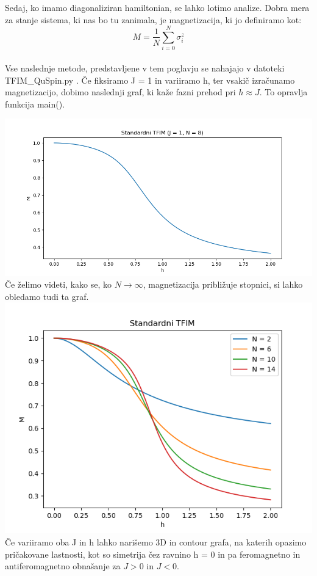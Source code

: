 \documentclass{article}
\begin{document}
 

\noindent Sedaj, ko imamo diagonaliziran hamiltonian, se lahko lotimo analize. Dobra mera za stanje sistema, ki nas bo tu zanimala, je magnetizacija, ki jo definiramo kot:
\begin{equation}
    M = \frac{1}{N}\sum_{i=0}^N \sigma_i^z
\end{equation}\\
Vse naslednje metode, predstavljene v tem poglavju se nahajajo v datoteki TFIM\_QuSpin.py .
Če fiksiramo J = 1 in variiramo h, ter vsakič izračunamo magnetizacijo, dobimo naslednji graf, ki kaže fazni prehod pri $h \approx J$. To opravlja funkcija main().

\includegraphics[width = \linewidth]{STFIM1.png}
Če želimo videti, kako se, ko $N \rightarrow \infty$, magnetizacija približuje stopnici, si lahko obledamo tudi ta graf.
\includegraphics[width = \linewidth]{STFIM_variableN2.png}
\newpage
\noindent Če variiramo oba J in h lahko narišemo 3D in contour grafa, na katerih opazimo pričakovane lastnosti, kot so simetrija čez ravnino h = 0 in pa feromagnetno in antiferomagnetno obnašanje za $J > 0$ in $J < 0$.\\\\
\end{document}
